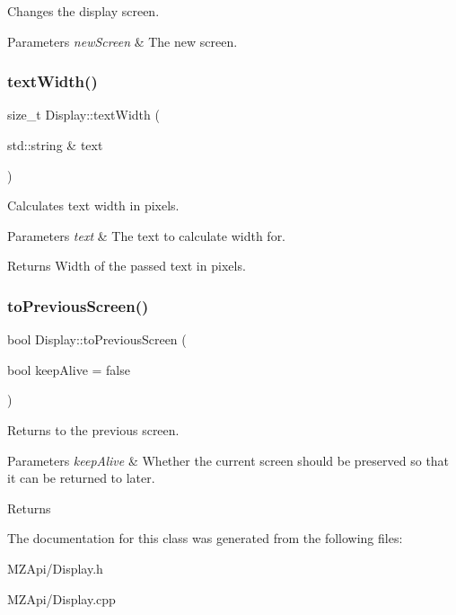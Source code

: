 Changes the display screen. 


\begin{DoxyParams}{Parameters}
{\em new\+Screen} & The new screen. \\
\hline
\end{DoxyParams}
\mbox{\label{classDisplay_a60f87a87dc86ca281c1095de69e981e6}} 
\subsubsection{\texorpdfstring{text\+Width()}{textWidth()}}
{\footnotesize\ttfamily size\+\_\+t Display\+::text\+Width (\begin{DoxyParamCaption}\item[{std\+::string \&}]{text }\end{DoxyParamCaption})}



Calculates text width in pixels. 


\begin{DoxyParams}{Parameters}
{\em text} & The text to calculate width for. \\
\hline
\end{DoxyParams}
\begin{DoxyReturn}{Returns}
Width of the passed text in pixels. 
\end{DoxyReturn}
\mbox{\label{classDisplay_ad043404964c19f51bb903da796aaefda}} 
\subsubsection{\texorpdfstring{to\+Previous\+Screen()}{toPreviousScreen()}}
{\footnotesize\ttfamily bool Display\+::to\+Previous\+Screen (\begin{DoxyParamCaption}\item[{bool}]{keep\+Alive = {\ttfamily false} }\end{DoxyParamCaption})}



Returns to the previous screen. 


\begin{DoxyParams}{Parameters}
{\em keep\+Alive} & Whether the current screen should be preserved so that it can be returned to later. \\
\hline
\end{DoxyParams}
\begin{DoxyReturn}{Returns}

\end{DoxyReturn}


The documentation for this class was generated from the following files\+:\begin{DoxyCompactItemize}
\item 
M\+Z\+Api/Display.\+h\item 
M\+Z\+Api/Display.\+cpp\end{DoxyCompactItemize}
